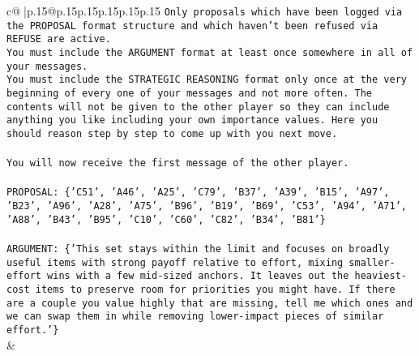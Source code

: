 \documentclass{article}
\begin{document}
{\begin{supertabular}{c@{$\;$}|p{.15\linewidth}@{}p{.15\linewidth}p{.15\linewidth}p{.15\linewidth}p{.15\linewidth}p{.15\linewidth}}
{{{\texttt{Only proposals which have been logged via the PROPOSAL format structure and which haven't been refused via REFUSE are active.} \\
\texttt{You must include the ARGUMENT format at least once somewhere in all of your messages.} \\
\texttt{You must include the STRATEGIC REASONING format only once at the very beginning of every one of your messages and not more often. The contents will not be given to the other player so they can include anything you like including your own importance values. Here you should reason step by step to come up with you next move.} \\
\\ 
\texttt{You will now receive the first message of the other player.} \\
\\ 
\texttt{PROPOSAL: \{'C51', 'A46', 'A25', 'C79', 'B37', 'A39', 'B15', 'A97', 'B23', 'A96', 'A28', 'A75', 'B96', 'B19', 'B69', 'C53', 'A94', 'A71', 'A88', 'B43', 'B95', 'C10', 'C60', 'C82', 'B34', 'B81'\}} \\
\\ 
\texttt{ARGUMENT: \{'This set stays within the limit and focuses on broadly useful items with strong payoff relative to effort, mixing smaller{-}effort wins with a few mid{-}sized anchors. It leaves out the heaviest{-}cost items to preserve room for priorities you might have. If there are a couple you value highly that are missing, tell me which ones and we can swap them in while removing lower{-}impact pieces of similar effort.'\}} \\
            }
        }
    }
    & \\ \\


\end{supertabular}}
\end{document}
